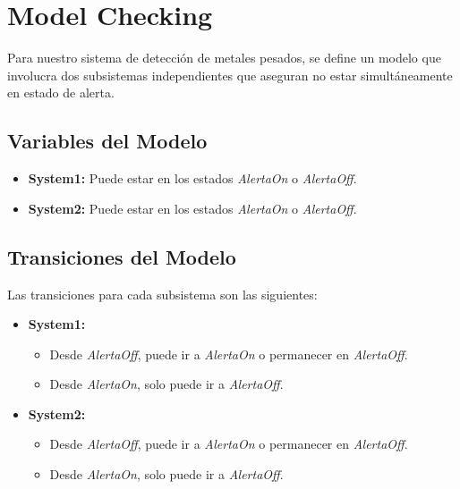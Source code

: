 \section{Model Checking}
Para nuestro sistema de detección de metales pesados, se define un modelo que involucra dos subsistemas independientes que aseguran no estar simultáneamente en estado de alerta.

\subsection*{Variables del Modelo}
\begin{itemize}
    \item \textbf{System1:} Puede estar en los estados \textit{AlertaOn} o \textit{AlertaOff}.
    \item \textbf{System2:} Puede estar en los estados \textit{AlertaOn} o \textit{AlertaOff}.
\end{itemize}

\subsection*{Transiciones del Modelo}
Las transiciones para cada subsistema son las siguientes:
\begin{itemize}
    \item \textbf{System1:}
    \begin{itemize}
        \item Desde \textit{AlertaOff}, puede ir a \textit{AlertaOn} o permanecer en \textit{AlertaOff}.
        \item Desde \textit{AlertaOn}, solo puede ir a \textit{AlertaOff}.
    \end{itemize}
    \item \textbf{System2:}
    \begin{itemize}
        \item Desde \textit{AlertaOff}, puede ir a \textit{AlertaOn} o permanecer en \textit{AlertaOff}.
        \item Desde \textit{AlertaOn}, solo puede ir a \textit{AlertaOff}.
    \end{itemize}
\end{itemize}

